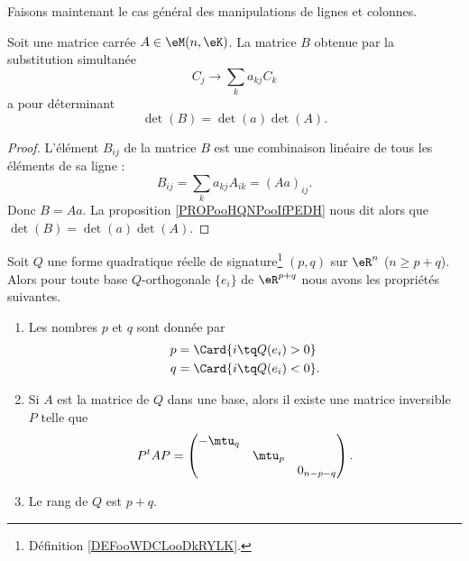 Faisons maintenant le cas général des manipulations de lignes et colonnes.

\begin{proposition}     \label{PROPooSLLGooSZjQrv}
	Soit une matrice carrée \( A\in \eM(n,\eK)\). La matrice \( B\) obtenue par la substitution simultanée
	\begin{equation}
		C_j\to \sum_ka_{kj}C_k
	\end{equation}
	a pour déterminant
	\begin{equation}
		\det(B)=\det(a)\det(A).
	\end{equation}
\end{proposition}

\begin{proof}
	L'élément \( B_{ij}\) de la matrice \( B\) est une combinaison linéaire de tous les éléments de sa ligne :
	\begin{equation}
		B_{ij}=\sum_ka_{kj}A_{ik}=(Aa)_{ij}.
	\end{equation}
	Donc \( B=Aa\). La proposition \ref{PROPooHQNPooIfPEDH} nous dit alors que \( \det(B)=\det(a)\det(A)\).
\end{proof}

\begin{theorem}   \label{ThoQFVsBCk}
	Soit \( Q\) une forme quadratique réelle de signature\footnote{Définition \ref{DEFooWDCLooDkRYLK}.} \( (p,q)\) sur \( \eR^n\) (\( n\geq p+q\)). Alors pour toute base \( Q\)-orthogonale \( \{ e_i \}\) de \( \eR^{p+q}\) nous avons les propriétés suivantes.
	\begin{enumerate}
		\item       \label{ITEMooCFQHooRWfmpT}
		      Les nombres \( p\) et \( q\) sont donnée par
		      \begin{subequations}
			      \begin{align}
				      p & =\Card\{ i\tq Q(e_i)>0 \}             \label{SUBEQooONWLooNsgmQY} \\
				      q & =\Card\{ i\tq Q(e_i)<0 \}.        \label{SUBEQooFKXMooOVwvKR}
			      \end{align}
		      \end{subequations}
		\item       \label{ITEMooWLPVooSTOOjL}
		      Si \( A\) est la matrice de \( Q\) dans une base, alors il existe une matrice inversible \( P\) telle que
		      \begin{equation}
			      P^tAP=\begin{pmatrix}
				      -\mtu_q &        &           \\
				              & \mtu_p &           \\
				              &        & 0_{n-p-q}
			      \end{pmatrix}.
		      \end{equation}
		\item       \label{ITEMooGOHCooPrNQwm}
		      Le rang de \( Q\) est \( p+q\).
	\end{enumerate}
\end{theorem}

